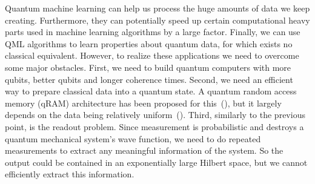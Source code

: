\documentclass[a4paper,10pt]{article}
\begin{document}
Quantum machine learning can help us process the huge amounts of data we keep creating.
Furthermore, they can potentially speed up certain computational heavy parts used in machine learning algorithms by a large factor.
Finally, we can use QML algorithms to learn properties about quantum data, for which exists no classical equivalent.
However, to realize these applications we need to overcome some major obstacles.
First, we need to build quantum computers with more qubits, better qubits and longer coherence times.
Second, we need an efficient way to prepare classical data into a quantum state.
A quantum random access memory (qRAM) architecture has been proposed for this~(\cite{qram}), but it largely depends on the data being relatively uniform~(\cite{aaronson2015read}).
Third, similarly to the previous point, is the readout problem.
Since measurement is probabilistic and destroys a quantum mechanical system's wave function, we need to do repeated measurements to extract any meaningful information of the system.
So the output could be contained in an exponentially large Hilbert space, but we cannot efficiently extract this information.
\end{document}
